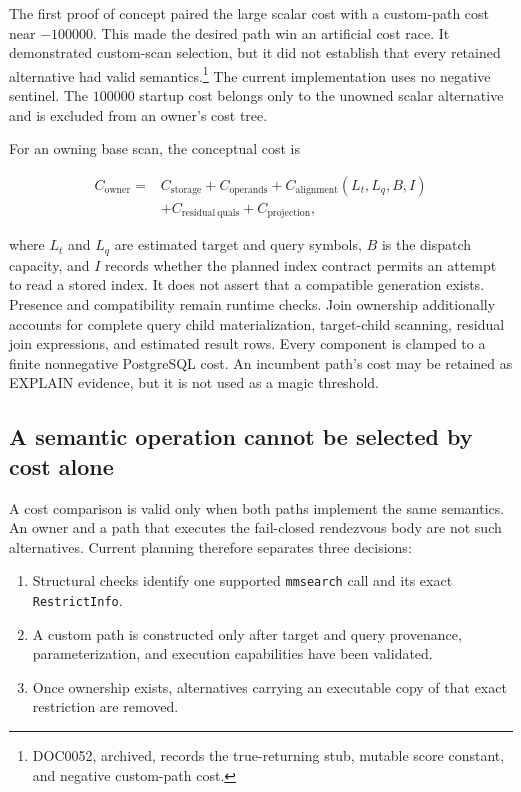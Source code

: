 The first proof of concept paired the large scalar cost with a custom-path
cost near \(-100000\).  This made the desired path win an artificial cost
race.  It demonstrated custom-scan selection, but it did not establish that
every retained alternative had valid semantics.\footnote{DOC0052,
archived, records the true-returning stub, mutable score constant, and
negative custom-path cost.}  The current implementation uses no negative
sentinel.  The \(100000\) startup cost belongs only to the unowned scalar
alternative and is excluded from an owner's cost tree.

For an owning base scan, the conceptual cost is

\[
\begin{split}
 C_{\mathrm{owner}} ={}&
 C_{\mathrm{storage}} +
 C_{\mathrm{operands}} +
 C_{\mathrm{alignment}}(L_t,L_q,B,I)\\
 &+ C_{\mathrm{residual\ quals}} +
 C_{\mathrm{projection}} ,
\end{split}
\]

where \(L_t\) and \(L_q\) are estimated target and query symbols, \(B\) is
the dispatch capacity, and \(I\) records whether the planned index contract
permits an attempt to read a stored index.  It does not assert that a
compatible generation exists.  Presence and compatibility remain runtime
checks.  Join ownership additionally accounts for complete query child
materialization, target-child scanning, residual join expressions, and
estimated result rows.  Every component is clamped to a finite nonnegative
PostgreSQL cost.  An incumbent path's cost may be retained as EXPLAIN
evidence, but it is not used as a magic threshold.

\subsection{A semantic operation cannot be selected by cost alone}

A cost comparison is valid only when both paths implement the same semantics.
An owner and a path that executes the fail-closed rendezvous body are not such
alternatives.  Current planning therefore separates three decisions:

\begin{enumerate}
  \item Structural checks identify one supported \texttt{mmsearch} call and
  its exact \texttt{RestrictInfo}.
  \item A custom path is constructed only after target and query provenance,
  parameterization, and execution capabilities have been validated.
  \item Once ownership exists, alternatives carrying an executable copy of
  that exact restriction are removed.
\end{enumerate}

